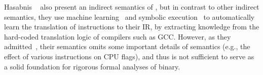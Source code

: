 Hasabnis \etal~\cite{Hasabnis:ASPLOS16, Hasabnis:FSE16} also present an indirect semantics of \ISA, but in contrast to other indirect semantics, they use machine learning~\cite{Hasabnis:ASPLOS16} and symbolic 
execution~\cite{Hasabnis:FSE16} to automatically learn the translation of \ISA instructions to their IR, by extracting knowledge from the hard-coded  translation logic of compilers such as GCC.
However, as they admitted~\cite{Hasabnis:FSE16}, their semantics omits some important details of \ISA semantics (e.g., the effect of various instructions on CPU flags), and thus is not sufficient to serve as a solid foundation for rigorous formal analyses of \ISA binary.

  






